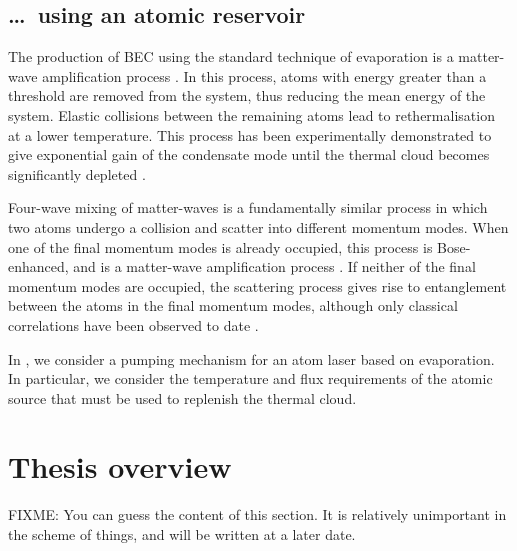 \subsection{\dots\ using an atomic reservoir}

The production of BEC using the standard technique of evaporation \citep{Hess:1986,Ketterle:1996} is a matter-wave amplification process \citep{Luiten:1996,Gardiner:1997uq,Miesner:1998}.  In this process, atoms with energy greater than a threshold are removed from the system, thus reducing the mean energy of the system.  Elastic collisions between the remaining atoms lead to rethermalisation at a lower temperature.  This process has been experimentally demonstrated to give exponential gain of the condensate mode until the thermal cloud becomes significantly depleted \citep{Miesner:1998}.

Four-wave mixing of matter-waves \citep{Deng:1999qy} is a fundamentally similar process in which two atoms undergo a collision and scatter into different momentum modes.  When one of the final momentum modes is already occupied, this process is Bose-enhanced, and is a matter-wave amplification process \citep{Vogels:2002}.  If neither of the final momentum modes are occupied, the scattering process gives rise to entanglement between the atoms in the final momentum modes, although only classical correlations have been observed to date \citep{Perrin:2007}.

In , we consider a pumping mechanism for an atom laser based on evaporation.  In particular, we consider the temperature and flux requirements of the atomic source that must be used to replenish the thermal cloud.



\section{Thesis overview}
FIXME: You can guess the content of this section.  It is relatively unimportant in the scheme of things, and will be written at a later date.
